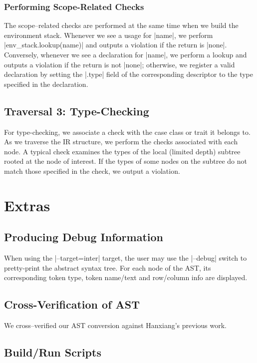 \subsubsection{Performing Scope-Related Checks}
The scope--related checks are performed at the same time when we build the environment stack. Whenever we see a usage for |name|, we perform |env_stack.lookup(name)| and outputs a violation if the return is |none|. Conversely, whenever we see a declaration for |name|, we perform a lookup and outputs a violation if the return is not |none|; otherwise, we register a valid declaration by setting the |.type| field of the corresponding descriptor to the type specified in the declaration.

\subsection{Traversal 3: Type-Checking}

For type-checking, we associate a check with the case class or trait it belongs to. As we traverse the IR structure, we perform the checks associated with each node. A typical check examines the types of the local (limited depth) subtree rooted at the node of interest. If the types of some nodes on the subtree do not match those specified in the check, we output a violation.

\section{Extras}

\subsection{Producing Debug Information}

When using the |--target=inter| target, the user may use the |--debug| switch to pretty-print the abstract syntax tree. For each node of the AST, its corresponding token type, token name/text and row/column info are displayed.

\subsection{Cross-Verification of AST}

We cross--verified our AST conversion against Hanxiang's previous work.

\subsection{Build/Run Scripts}

